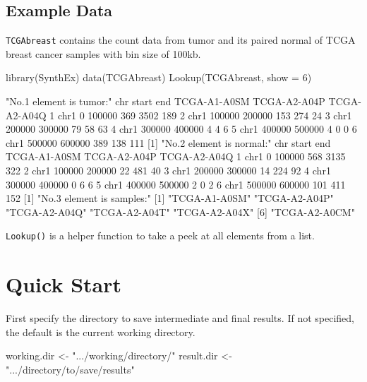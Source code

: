 \documentclass{article}
\newcommand{\code}[1]{\texttt{#1}}
\begin{document}
\subsection{Example Data}
\code{TCGAbreast} contains the count data from tumor and its paired normal of TCGA breast cancer samples with bin size of 100kb.
\begin{Schunk}
\begin{Sinput}
 library(SynthEx)
 data(TCGAbreast)
 Lookup(TCGAbreast, show = 6)
\end{Sinput}
\begin{Soutput}
[1] "No.1 element is tumor:"
   chr  start    end TCGA-A1-A0SM TCGA-A2-A04P TCGA-A2-A04Q
1 chr1      0 100000          369         3502          189
2 chr1 100000 200000          153          274           24
3 chr1 200000 300000           79           58           63
4 chr1 300000 400000            4            4            6
5 chr1 400000 500000            4            0            0
6 chr1 500000 600000          389          138          111
[1] "No.2 element is normal:"
   chr  start    end TCGA-A1-A0SM TCGA-A2-A04P TCGA-A2-A04Q
1 chr1      0 100000          568         3135          322
2 chr1 100000 200000           22          481           40
3 chr1 200000 300000           14          224           92
4 chr1 300000 400000            0            6            6
5 chr1 400000 500000            2            0            2
6 chr1 500000 600000          101          411          152
[1] "No.3 element is samples:"
[1] "TCGA-A1-A0SM" "TCGA-A2-A04P" "TCGA-A2-A04Q" "TCGA-A2-A04T" "TCGA-A2-A04X"
[6] "TCGA-A2-A0CM"
\end{Soutput}
\end{Schunk}
\code{Lookup()} is a helper function to take a peek at all elements from a list.


\section{Quick Start}

First specify the directory to save intermediate and final results. If not specified, the default is the current working directory.

\begin{Schunk}
\begin{Sinput}
 working.dir <- ".../working/directory/"
 result.dir <- ".../directory/to/save/results"
\end{Sinput}
\end{Schunk}
\end{document}
